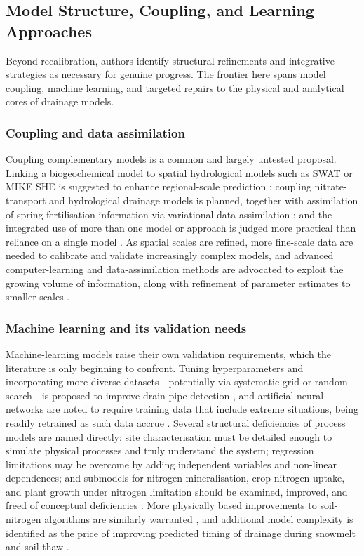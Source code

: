 \documentclass[11pt]{article}
\begin{document}
\subsection{Model Structure, Coupling, and Learning Approaches}

Beyond recalibration, authors identify structural refinements and integrative strategies as necessary for genuine progress. The frontier here spans model coupling, machine learning, and targeted repairs to the physical and analytical cores of drainage models.

\subsubsection{Coupling and data assimilation}

Coupling complementary models is a common and largely untested proposal. Linking a biogeochemical model to spatial hydrological models such as SWAT or MIKE SHE is suggested to enhance regional-scale prediction \parencite{Li2006}; coupling nitrate-transport and hydrological drainage models is planned, together with assimilation of spring-fertilisation information via variational data assimilation \parencite{Chelil2022}; and the integrated use of more than one model or approach is judged more practical than reliance on a single model \parencite{Singh2019b}. As spatial scales are refined, more fine-scale data are needed to calibrate and validate increasingly complex models, and advanced computer-learning and data-assimilation methods are advocated to exploit the growing volume of information, along with refinement of parameter estimates to smaller scales \parencite{Apostel2021}.

\subsubsection{Machine learning and its validation needs}

Machine-learning models raise their own validation requirements, which the literature is only beginning to confront. Tuning hyperparameters and incorporating more diverse datasets---potentially via systematic grid or random search---is proposed to improve drain-pipe detection \parencite{Song2021}, and artificial neural networks are noted to require training data that include extreme situations, being readily retrained as such data accrue \parencite{Yang2000}. Several structural deficiencies of process models are named directly: site characterisation must be detailed enough to simulate physical processes and truly understand the system; regression limitations may be overcome by adding independent variables and non-linear dependences; and submodels for nitrogen mineralisation, crop nitrogen uptake, and plant growth under nitrogen limitation should be examined, improved, and freed of conceptual deficiencies \parencite{Ahuja2007}. More physically based improvements to soil-nitrogen algorithms are similarly warranted \parencite{Ikenberry2017}, and additional model complexity is identified as the price of improving predicted timing of drainage during snowmelt and soil thaw \parencite{Feyereisen2007}.
\end{document}
